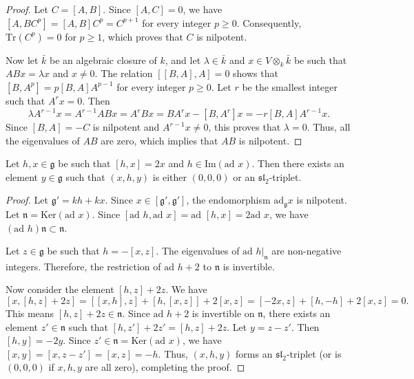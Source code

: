 \begin{proof}
    Let $C = [A, B]$. Since $[A, C] = 0$, we have $[A, BC^p] = [A, B]C^p = C^{p+1}$ for every integer $p \geq 0$. Consequently, $\text{Tr}(C^p) = 0$ for $p \geq 1$, which proves that $C$ is nilpotent.

    Now let $\bar{k}$ be an algebraic closure of $k$, and let $\lambda \in \bar{k}$ and $x \in V \otimes_k \bar{k}$ be such that $ABx = \lambda x$ and $x \neq 0$. The relation $[[B, A], A] = 0$ shows that $[B, A^p] = p[B, A]A^{p-1}$ for every integer $p \geq 0$. Let $r$ be the smallest integer such that $A^r x = 0$. Then
    $$\lambda A^{r-1}x = A^{r-1}ABx = A^r Bx = B A^r x - [B, A^r]x = -r[B, A]A^{r-1}x.$$
    Since $[B, A] = -C$ is nilpotent and $A^{r-1}x \neq 0$, this proves that $\lambda = 0$. Thus, all the eigenvalues of $AB$ are zero, which implies that $AB$ is nilpotent.
\end{proof}

\begin{lemma}
    \label{lem:existence_of_third_element}
    Let $h, x \in \mathfrak{g}$ be such that $[h, x] = 2x$ and $h \in \text{Im}(\text{ad } x)$. Then there exists an element $y \in \mathfrak{g}$ such that $(x, h, y)$ is either $(0, 0, 0)$ or an $\mathfrak{sl}_2$-triplet.
\end{lemma}

\begin{proof}
    Let $\mathfrak{g}' = kh + kx$. Since $x \in [\mathfrak{g}', \mathfrak{g}']$, the endomorphism $\text{ad}_\mathfrak{g} x$ is nilpotent. Let $\mathfrak{n} = \text{Ker}(\text{ad } x)$. Since $[\text{ad } h, \text{ad } x] = \text{ad } [h, x] = 2 \text{ad } x$, we have $(\text{ad } h)\mathfrak{n} \subset \mathfrak{n}$.

    Let $z \in \mathfrak{g}$ be such that $h = -[x, z]$. The eigenvalues of $\text{ad } h|_{\mathfrak{n}}$ are non-negative integers. Therefore, the restriction of $\text{ad } h + 2$ to $\mathfrak{n}$ is invertible.

    Now consider the element $[h, z] + 2z$. We have
    $$[x, [h, z] + 2z] = [[x, h], z] + [h, [x, z]] + 2[x, z] = [-2x, z] + [h, -h] + 2[x, z] = 0.$$
    This means $[h, z] + 2z \in \mathfrak{n}$. Since $\text{ad } h + 2$ is invertible on $\mathfrak{n}$, there exists an element $z' \in \mathfrak{n}$ such that $[h, z'] + 2z' = [h, z] + 2z$. Let $y = z - z'$. Then $[h, y] = -2y$. Since $z' \in \mathfrak{n} = \text{Ker}(\text{ad } x)$, we have $[x, y] = [x, z - z'] = [x, z] = -h$. Thus, $(x, h, y)$ forms an $\mathfrak{sl}_2$-triplet (or is $(0,0,0)$ if $x,h,y$ are all zero), completing the proof.
\end{proof}

